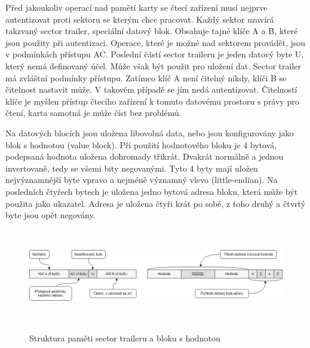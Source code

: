 \par
Před jakoukoliv operací nad pamětí karty se čtecí zařízení musí nejprve autentizovat proti sektoru se kterým chce pracovat. Každý sektor uzavírá takzvaný sector trailer, speciální datový blok. Obsahuje tajné klíče A a B, které jsou použity při autentizaci. Operace, které je možné nad sektorem provádět, jsou v podmínkách přístupu AC. Poslední částí sector traileru je jeden datový byte U, který nemá definovaný účel. Může však být použit pro uložení dat. Sector trailer má zvláštní  podmínky přístupu. Zatímco klíč A není čitelný nikdy, klíči B se čitelnost nastavit může. V takovém případě se jím nedá autentizovat. Čitelností klíče je myšlen přístup čtecího zařízení k tomuto datovému prostoru s právy pro čtení, karta samotná je může číst bez problémů.
\par
Na datových blocích jsou uložena libovolná data, nebo jsou konfigurovány jako blok s hodnotou (value block). Při použití hodnotového bloku je 4 bytová, podepsaná hodnota uložena dohromady třikrát. Dvakrát normálně a jednou invertovaně, tedy se všemi bity negovanými. Tyto 4 byty mají uložen nejvýznamnější byte vpravo a nejméně významný vlevo ({little-endian}). Na posledních čtyřech bytech je uložena jedno bytová adresa bloku, která může být použita jako ukazatel. Adresa je uložena čtyři krát po sobě, z toho druhý a čtvrtý byte jsou opět negovány\cite{PracticalAttackOnMIFARE}.

\begin{figure}[h]\centering
  \centering
  \hspace*{-0.07\linewidth}
  \includegraphics[width=1.1\linewidth,height=1.6in]{obrazky-figures/LogicalStructureBetter.png}\\[1pt]  
  \caption{Struktura paměti sector traileru a bloku s hodnotou\cite{PracticalAttackOnMIFARE}}    
  \label{obrazekStrukturaSpecialnichBloku}
\end{figure}

